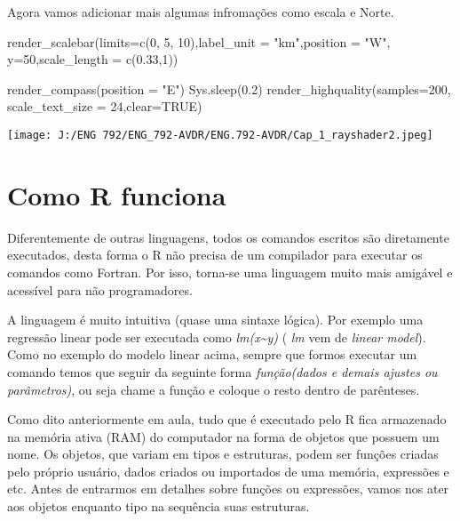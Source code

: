 \documentclass[
]{book}
\newenvironment{Shaded}{\begin{snugshade}}{\end{snugshade}}
\newcommand{\AttributeTok}[1]{\textcolor[rgb]{0.77,0.63,0.00}{#1}}
\newcommand{\ConstantTok}[1]{\textcolor[rgb]{0.00,0.00,0.00}{#1}}
\newcommand{\DecValTok}[1]{\textcolor[rgb]{0.00,0.00,0.81}{#1}}
\newcommand{\FloatTok}[1]{\textcolor[rgb]{0.00,0.00,0.81}{#1}}
\newcommand{\FunctionTok}[1]{\textcolor[rgb]{0.00,0.00,0.00}{#1}}
\newcommand{\NormalTok}[1]{#1}
\newcommand{\StringTok}[1]{\textcolor[rgb]{0.31,0.60,0.02}{#1}}
\begin{document}
Agora vamos adicionar mais algumas infromações como escala e Norte.

\begin{Shaded}
\begin{Highlighting}[]
\FunctionTok{render\_scalebar}\NormalTok{(}\AttributeTok{limits=}\FunctionTok{c}\NormalTok{(}\DecValTok{0}\NormalTok{, }\DecValTok{5}\NormalTok{, }\DecValTok{10}\NormalTok{),}\AttributeTok{label\_unit =} \StringTok{"km"}\NormalTok{,}\AttributeTok{position =} \StringTok{"W"}\NormalTok{, }\AttributeTok{y=}\DecValTok{50}\NormalTok{,}\AttributeTok{scale\_length =} \FunctionTok{c}\NormalTok{(}\FloatTok{0.33}\NormalTok{,}\DecValTok{1}\NormalTok{))}

\FunctionTok{render\_compass}\NormalTok{(}\AttributeTok{position =} \StringTok{"E"}\NormalTok{)}
\FunctionTok{Sys.sleep}\NormalTok{(}\FloatTok{0.2}\NormalTok{)}
\FunctionTok{render\_highquality}\NormalTok{(}\AttributeTok{samples=}\DecValTok{200}\NormalTok{, }\AttributeTok{scale\_text\_size =} \DecValTok{24}\NormalTok{,}\AttributeTok{clear=}\ConstantTok{TRUE}\NormalTok{)}
\end{Highlighting}
\end{Shaded}

\texttt{[image: J:/ENG 792/ENG\_792-AVDR/ENG.792-AVDR/Cap\_1\_rayshader2.jpeg]}

\hypertarget{como-r-funciona}{%
\section{Como R funciona}\label{como-r-funciona}}

Diferentemente de outras linguagens, todos os comandos escritos são diretamente executados, desta forma o R não precisa de um compilador para executar os comandos como Fortran. Por isso, torna-se uma linguagem muito mais amigável e acessível para não programadores.

A linguagem é muito intuitiva (quase uma sintaxe lógica). Por exemplo uma regressão linear pode ser executada como \emph{lm(x\textasciitilde y)} ( \emph{\emph{lm}} vem de \emph{\emph{linear model}}). Como no exemplo do modelo linear acima, sempre que formos executar um comando temos que seguir da seguinte forma \emph{\emph{função(dados e demais ajustes ou parâmetros)}}, ou seja chame a função e coloque o resto dentro de parênteses.

Como dito anteriormente em aula, tudo que é executado pelo R fica armazenado na memória ativa (RAM) do computador na forma de objetos que possuem um nome. Os objetos, que variam em tipos e estruturas, podem ser funções criadas pelo próprio usuário, dados criados ou importados de uma memória, expressões e etc. Antes de entrarmos em detalhes sobre funções ou expressões, vamos nos ater aos objetos enquanto tipo na sequência suas estruturas.
\end{document}
